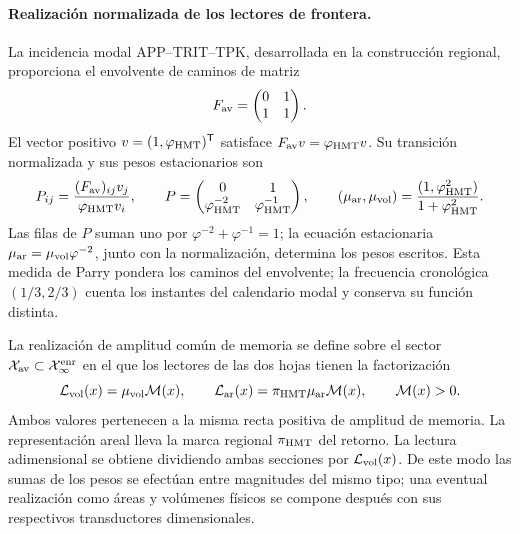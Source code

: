 \paragraph{Realización normalizada de los lectores de frontera.}
La incidencia modal APP--TRIT--TPK, desarrollada en la construcción
regional, proporciona el envolvente de caminos de matriz
\[
 F_{\rm av}=\begin{pmatrix}0&1\\1&1\end{pmatrix}.
\]
El vector positivo \(v=(1,\varphi_{\rm HMT})^{\mathsf T}\)
satisface \(F_{\rm av}v=\varphi_{\rm HMT}v\). Su transición
normalizada y sus pesos estacionarios son
\begin{equation}
 P_{ij}=\frac{(F_{\rm av})_{ij}v_j}{\varphi_{\rm HMT}v_i},
 \qquad
 P=\begin{pmatrix}0&1\\
 \varphi_{\rm HMT}^{-2}&\varphi_{\rm HMT}^{-1}\end{pmatrix},
 \qquad
 (\mu_{\rm ar},\mu_{\rm vol})
 =\frac{(1,\varphi_{\rm HMT}^{2})}{1+\varphi_{\rm HMT}^{2}}.
 \label{vii:eq:lectores-parry}
\end{equation}
Las filas de \(P\) suman uno por
\(\varphi^{-2}+\varphi^{-1}=1\); la ecuación estacionaria
\(\mu_{\rm ar}=\mu_{\rm vol}\varphi^{-2}\), junto con la
normalización, determina los pesos escritos. Esta medida de Parry
pondera los caminos del envolvente; la frecuencia cronológica
\((1/3,2/3)\) cuenta los instantes del calendario modal y conserva
su función distinta.

La realización de amplitud común de memoria se define sobre el sector
\(\mathcal X_{\rm av}\subset\mathcal X_\infty^{\rm enr}\) en el que
los lectores de las dos hojas tienen la factorización
\begin{equation}
 \mathcal L_{\rm vol}(x)=\mu_{\rm vol}\mathcal M(x),\qquad
 \mathcal L_{\rm ar}(x)=\pi_{\rm HMT}\mu_{\rm ar}\mathcal M(x),
 \qquad \mathcal M(x)>0.
 \label{vii:eq:lectores-amplitud-comun}
\end{equation}
Ambos valores pertenecen a la misma recta positiva de amplitud de
memoria. La representación areal lleva la marca regional
\(\pi_{\rm HMT}\) del retorno. La lectura adimensional se obtiene
dividiendo ambas secciones por \(\mathcal L_{\rm vol}(x)\).
De este modo las sumas de los pesos se efectúan entre magnitudes del
mismo tipo; una eventual realización como áreas y volúmenes físicos
se compone después con sus respectivos transductores dimensionales.

